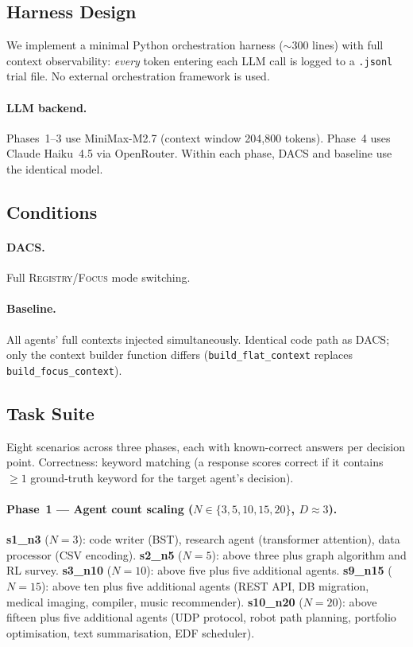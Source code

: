 \documentclass{article}
\begin{document}
\subsection{Harness Design}
\label{sec:harness}

We implement a minimal Python orchestration harness ($\sim$300 lines)
with full context observability: \emph{every} token entering each LLM
call is logged to a \texttt{.jsonl} trial file.
No external orchestration framework is used.

\paragraph{LLM backend.}
Phases~1--3 use MiniMax-M2.7 (context window 204{,}800 tokens).
Phase~4 uses Claude Haiku~4.5 via OpenRouter.
Within each phase, DACS and baseline use the identical model.

\subsection{Conditions}
\label{sec:conditions}

\paragraph{DACS.} Full \textsc{Registry}/\textsc{Focus} mode switching.

\paragraph{Baseline.} All agents' full contexts injected simultaneously.
Identical code path as DACS; only the context builder function differs
(\texttt{build\_flat\_context} replaces \texttt{build\_focus\_context}).

\subsection{Task Suite}
\label{sec:tasks}

Eight scenarios across three phases, each with known-correct answers
per decision point.
Correctness: keyword matching (a response scores correct if it contains
$\geq 1$ ground-truth keyword for the target agent's decision).

\paragraph{Phase~1 --- Agent count scaling ($N{\in}\{3,5,10,15,20\}$, $D{\approx}3$).}
\textbf{s1\_n3} ($N{=}3$): code writer (BST), research agent (transformer
attention), data processor (CSV encoding).
\textbf{s2\_n5} ($N{=}5$): above three plus graph algorithm and RL survey.
\textbf{s3\_n10} ($N{=}10$): above five plus five additional agents.
\textbf{s9\_n15} ($N{=}15$): above ten plus five additional agents (REST API, DB migration, medical imaging, compiler, music recommender).
\textbf{s10\_n20} ($N{=}20$): above fifteen plus five additional agents (UDP protocol, robot path planning, portfolio optimisation, text summarisation, EDF scheduler).
\end{document}
